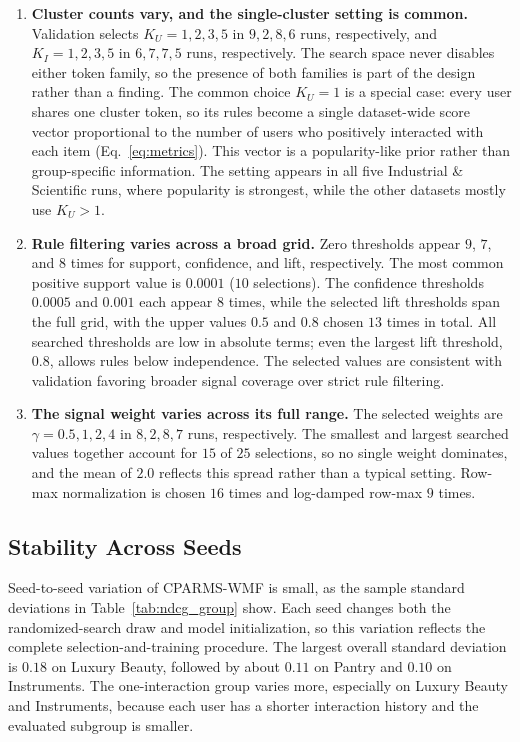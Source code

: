 \documentclass[pdflatex,sn-vancouver-num]{sn-jnl}%
\theoremstyle{thmstyleone}%
\theoremstyle{thmstyletwo}%
\theoremstyle{thmstylethree}%
\begin{document}
\begin{enumerate}
\item \textbf{Cluster counts vary, and the single-cluster setting is common.} Validation selects $K_U=1,2,3,5$ in $9,2,8,6$ runs, respectively, and $K_I=1,2,3,5$ in $6,7,7,5$ runs, respectively. The search space never disables either token family, so the presence of both families is part of the design rather than a finding. The common choice $K_U=1$ is a special case: every user shares one cluster token, so its rules become a single dataset-wide score vector proportional to the number of users who positively interacted with each item (Eq.~\eqref{eq:metrics}). This vector is a popularity-like prior rather than group-specific information. The setting appears in all five Industrial \& Scientific runs, where popularity is strongest, while the other datasets mostly use $K_U>1$.

\item \textbf{Rule filtering varies across a broad grid.} Zero thresholds appear $9$, $7$, and $8$ times for support, confidence, and lift, respectively. The most common positive support value is $0.0001$ ($10$ selections). The confidence thresholds $0.0005$ and $0.001$ each appear $8$ times, while the selected lift thresholds span the full grid, with the upper values $0.5$ and $0.8$ chosen $13$ times in total. All searched thresholds are low in absolute terms; even the largest lift threshold, $0.8$, allows rules below independence. The selected values are consistent with validation favoring broader signal coverage over strict rule filtering.

\item \textbf{The signal weight varies across its full range.} The selected weights are $\gamma=0.5,1,2,4$ in $8,2,8,7$ runs, respectively. The smallest and largest searched values together account for $15$ of $25$ selections, so no single weight dominates, and the mean of $2.0$ reflects this spread rather than a typical setting. Row-max normalization is chosen $16$ times and log-damped row-max $9$ times.
\end{enumerate}

\subsection{Stability Across Seeds}

Seed-to-seed variation of CPARMS-WMF is small, as the sample standard deviations in Table~\ref{tab:ndcg_group} show. Each seed changes both the randomized-search draw and model initialization, so this variation reflects the complete selection-and-training procedure. The largest overall standard deviation is $0.18$ on Luxury Beauty, followed by about $0.11$ on Pantry and $0.10$ on Instruments. The one-interaction group varies more, especially on Luxury Beauty and Instruments, because each user has a shorter interaction history and the evaluated subgroup is smaller.
\end{document}
